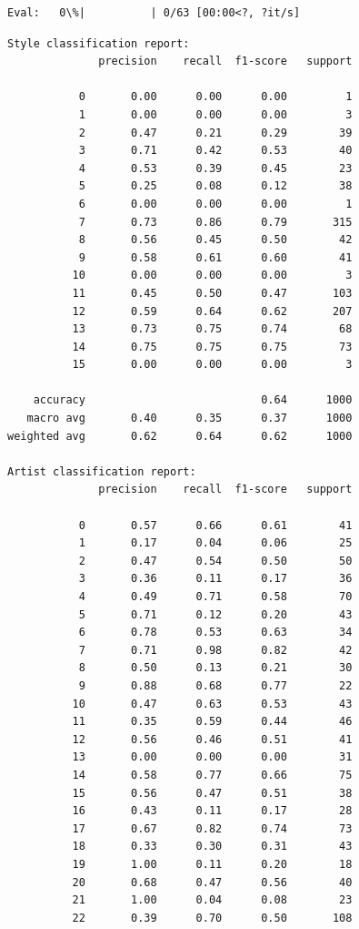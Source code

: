 \documentclass[11pt]{article}
\begin{document}
    
    \begin{Verbatim}[commandchars=\\\{\}]
Eval:   0\%|          | 0/63 [00:00<?, ?it/s]
    \end{Verbatim}

    
    \begin{Verbatim}[commandchars=\\\{\}]
Style classification report:
              precision    recall  f1-score   support

           0       0.00      0.00      0.00         1
           1       0.00      0.00      0.00         3
           2       0.47      0.21      0.29        39
           3       0.71      0.42      0.53        40
           4       0.53      0.39      0.45        23
           5       0.25      0.08      0.12        38
           6       0.00      0.00      0.00         1
           7       0.73      0.86      0.79       315
           8       0.56      0.45      0.50        42
           9       0.58      0.61      0.60        41
          10       0.00      0.00      0.00         3
          11       0.45      0.50      0.47       103
          12       0.59      0.64      0.62       207
          13       0.73      0.75      0.74        68
          14       0.75      0.75      0.75        73
          15       0.00      0.00      0.00         3

    accuracy                           0.64      1000
   macro avg       0.40      0.35      0.37      1000
weighted avg       0.62      0.64      0.62      1000

Artist classification report:
              precision    recall  f1-score   support

           0       0.57      0.66      0.61        41
           1       0.17      0.04      0.06        25
           2       0.47      0.54      0.50        50
           3       0.36      0.11      0.17        36
           4       0.49      0.71      0.58        70
           5       0.71      0.12      0.20        43
           6       0.78      0.53      0.63        34
           7       0.71      0.98      0.82        42
           8       0.50      0.13      0.21        30
           9       0.88      0.68      0.77        22
          10       0.47      0.63      0.53        43
          11       0.35      0.59      0.44        46
          12       0.56      0.46      0.51        41
          13       0.00      0.00      0.00        31
          14       0.58      0.77      0.66        75
          15       0.56      0.47      0.51        38
          16       0.43      0.11      0.17        28
          17       0.67      0.82      0.74        73
          18       0.33      0.30      0.31        43
          19       1.00      0.11      0.20        18
          20       0.68      0.47      0.56        40
          21       1.00      0.04      0.08        23
          22       0.39      0.70      0.50       108


\end{Verbatim}
\end{document}
